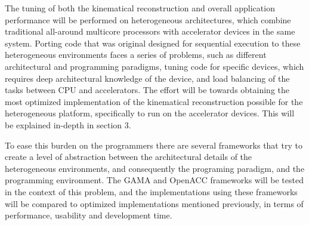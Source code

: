The tuning of both the kinematical reconstruction and overall application performance will be performed on heterogeneous architectures, which combine traditional all-around multicore processors with accelerator devices in the same system. Porting code that was original designed for sequential execution to these heterogeneous environments faces a series of problems, such as different architectural and programming paradigms, tuning code for specific devices, which requires deep architectural knowledge of the device, and load balancing of the tasks between CPU and accelerators. The effort will be towards obtaining the most optimized implementation of the kinematical reconstruction possible for the heterogeneous platform, specifically to run on the accelerator devices. This will be explained in-depth in section 3.

To ease this burden on the programmers there are several frameworks that try to create a level of abstraction between the architectural details of the heterogeneous environments, and consequently the programing paradigm, and the programming environment. The GAMA and OpenACC frameworks will be tested in the context of this problem, and the implementations using these frameworks will be compared to optimized implementations mentioned previously, in terms of performance, usability and development time.

\newpage
